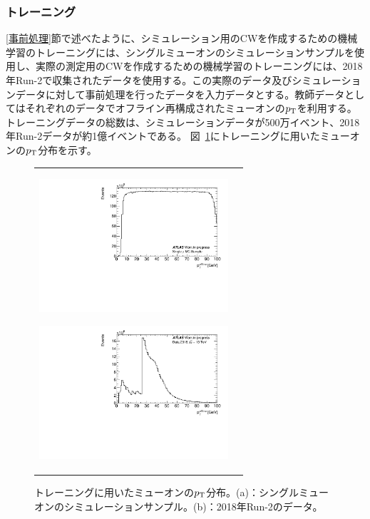 \subsubsection{トレーニング}
\ref{事前処理}節で述べたように、シミュレーション用のCWを作成するための機械学習のトレーニングには、シングルミューオンのシミュレーションサンプルを使用し、実際の測定用のCWを作成するための機械学習のトレーニングには、2018年Run-2で収集されたデータを使用する。この実際のデータ及びシミュレーションデータに対して事前処理を行ったデータを入力データとする。教師データとしてはそれぞれのデータでオフライン再構成されたミューオンの$p_{\rm{T}}$を利用する。
トレーニングデータの総数は、シミュレーションデータが500万イベント、2018年Run-2データが約1億イベントである。
図~\ref{Inputdata}にトレーニングに用いたミューオンの$p_{\rm{T}}$分布を示す。
\begin{figure}
    \begin{tabular}{cc}
    \centering
    \begin{minipage}[b]{0.45\hsize}%
        \centering
        \hspace*{-1cm}
        \includegraphics[clip, width=7cm]{fig/4/MC_input_pt100.pdf}
        \subcaption{}
        \label{MC_input}
    \end{minipage}%
    \begin{minipage}[b]{0.6\hsize}%
        \centering
        \hspace*{-1cm}
        \includegraphics[clip, width=7cm]{fig/4/Data_input_pt.pdf}
        \subcaption{}
        \label{Data_input}
    \end{minipage}%
    \end{tabular}
    \caption{トレーニングに用いたミューオンの$p_{\rm{T}}$分布。(a)：シングルミューオンのシミュレーションサンプル。(b)：2018年Run-2のデータ。}
    \label{Inputdata}
\end{figure}

